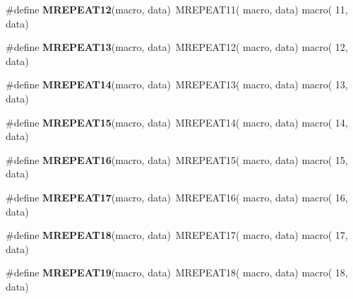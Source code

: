 \begin{DoxyCompactItemize}
\item 
\hypertarget{group__group__sam0__utils__mrepeat_ga5e8405725939e1548f4c09088bb9284a}{}\#define {\bfseries M\+R\+E\+P\+E\+A\+T12}(macro,  data)~M\+R\+E\+P\+E\+A\+T11( macro, data)   macro( 11, data)\label{group__group__sam0__utils__mrepeat_ga5e8405725939e1548f4c09088bb9284a}

\item 
\hypertarget{group__group__sam0__utils__mrepeat_ga235cc5c4e4fb84c9d44ee4b5b5b4a7d1}{}\#define {\bfseries M\+R\+E\+P\+E\+A\+T13}(macro,  data)~M\+R\+E\+P\+E\+A\+T12( macro, data)   macro( 12, data)\label{group__group__sam0__utils__mrepeat_ga235cc5c4e4fb84c9d44ee4b5b5b4a7d1}

\item 
\hypertarget{group__group__sam0__utils__mrepeat_gab75712b9509bac034c07db02ea0e0485}{}\#define {\bfseries M\+R\+E\+P\+E\+A\+T14}(macro,  data)~M\+R\+E\+P\+E\+A\+T13( macro, data)   macro( 13, data)\label{group__group__sam0__utils__mrepeat_gab75712b9509bac034c07db02ea0e0485}

\item 
\hypertarget{group__group__sam0__utils__mrepeat_gaa3c5de4c7a937ef2f00049285ed41a0a}{}\#define {\bfseries M\+R\+E\+P\+E\+A\+T15}(macro,  data)~M\+R\+E\+P\+E\+A\+T14( macro, data)   macro( 14, data)\label{group__group__sam0__utils__mrepeat_gaa3c5de4c7a937ef2f00049285ed41a0a}

\item 
\hypertarget{group__group__sam0__utils__mrepeat_gaf3c066d33ccd6fd8378495955121baae}{}\#define {\bfseries M\+R\+E\+P\+E\+A\+T16}(macro,  data)~M\+R\+E\+P\+E\+A\+T15( macro, data)   macro( 15, data)\label{group__group__sam0__utils__mrepeat_gaf3c066d33ccd6fd8378495955121baae}

\item 
\hypertarget{group__group__sam0__utils__mrepeat_gaff45aee56d734a3bdf90cdd86b5693d9}{}\#define {\bfseries M\+R\+E\+P\+E\+A\+T17}(macro,  data)~M\+R\+E\+P\+E\+A\+T16( macro, data)   macro( 16, data)\label{group__group__sam0__utils__mrepeat_gaff45aee56d734a3bdf90cdd86b5693d9}

\item 
\hypertarget{group__group__sam0__utils__mrepeat_gaeac781e6017f799e59bfc8d46e5cc9a1}{}\#define {\bfseries M\+R\+E\+P\+E\+A\+T18}(macro,  data)~M\+R\+E\+P\+E\+A\+T17( macro, data)   macro( 17, data)\label{group__group__sam0__utils__mrepeat_gaeac781e6017f799e59bfc8d46e5cc9a1}

\item 
\hypertarget{group__group__sam0__utils__mrepeat_ga9062731e6246bd538334f265e34870df}{}\#define {\bfseries M\+R\+E\+P\+E\+A\+T19}(macro,  data)~M\+R\+E\+P\+E\+A\+T18( macro, data)   macro( 18, data)\label{group__group__sam0__utils__mrepeat_ga9062731e6246bd538334f265e34870df}


\end{DoxyCompactItemize}
